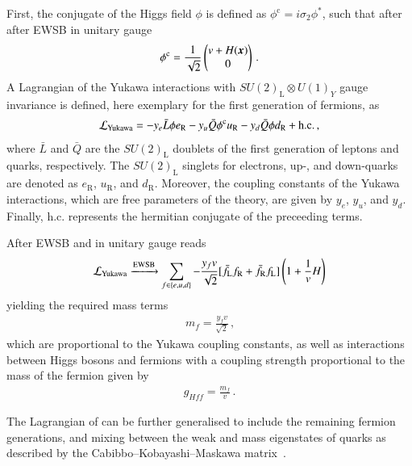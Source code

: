 First, the conjugate of the Higgs field $\phi$ is defined as
$\phi^{\text{c}} = i \sigma_2 \phi^*$, such that after after EWSB in unitary
gauge
\begin{align*}
  \phi^{\text{c}} = \frac{1}{\sqrt{2}}
  \begin{pmatrix}
    v + H(\myvec{x}) \\
    0
  \end{pmatrix} \,\text{.}
\end{align*}
A Lagrangian of the Yukawa interactions with $SU(2)_{\text{L}} \otimes U(1)_Y$
gauge invariance is defined, here exemplary for the first generation of
fermions, as
\begin{align}
  \mathcal{L}_{\text{Yukawa}} =
  - y_e \bar{L} \phi e_{\text{R}}
  - y_u \bar{Q} \phi^{\text{c}} u_{\text{R}}
  - y_d \bar{Q} \phi d_{\text{R}}
  + \text{h.c.} \,\text{,}
  \label{eq:lagrangian_yukawa}
\end{align}
where $\bar{L}$ and $\bar{Q}$ are the $SU(2)_{\text{L}}$ doublets of the first
generation of leptons and quarks, respectively. The $SU(2)_{\text{L}}$ singlets
for electrons, up-, and down-quarks are denoted as $e_{\text{R}}$,
$u_{\text{R}}$, and $d_{\text{R}}$. Moreover, the coupling constants of the
Yukawa interactions, which are free parameters of the theory, are given by
$y_e$, $y_u$, and $y_d$. Finally, $\text{h.c.}$ represents the hermitian
conjugate of the preceeding terms.

After EWSB and in unitary gauge  reads
\begin{align*}
  \mathcal{L}_{\text{Yukawa}} \xrightarrow{\text{EWSB}} \sum_{f \in \{e, u, d\}} -\frac{y_f v}{\sqrt{2}} [ \bar{f}_{\text{L}} f_{\text{R}} + \bar{f}_{\text{R}} f_{\text{L}} ] \left( 1 + \frac{1}{v} H \right)
\end{align*}
yielding the required mass terms
\begin{align*}
  m_f = \frac{y_f v}{\sqrt{2}} \,\text{,}
\end{align*}
which are proportional to the Yukawa coupling constants, as well as interactions
between Higgs bosons and fermions with a coupling strength proportional to the
mass of the fermion given by
\begin{align*}
  g_{Hff} = \frac{m_f}{v} \,\text{.}
\end{align*}

The Lagrangian of  can be further generalised to
include the remaining fermion generations, and mixing between the weak and mass
eigenstates of quarks as described by the Cabibbo--Kobayashi--Maskawa
matrix~\cite{Cabibbo:1963yz,Kobayashi:1973fv}.


